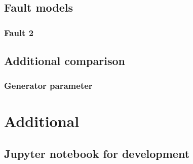 

\section{Fault models}

% 

\subsection*{Fault 2}


% 

\section{Additional comparison}

\subsection*{Generator parameter}


% 

\chapter{Additional}
\label{app:additional}

\section{Jupyter notebook for development}
\label{app:jupyter}